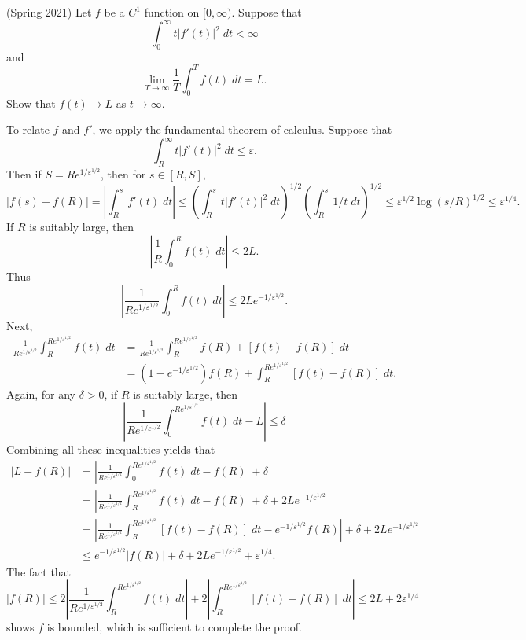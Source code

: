 \documentclass[answers]{exam}
\theoremstyle{problemstyle}
\newcommand{\1}[1]{\textbf{1}_{\left[#1\right]}} %
\begin{document}
\begin{questions}
\question (Spring 2021) Let $f$ be a $C^1$ function on $[0,\infty)$. Suppose that
%
\[ \int_0^\infty t |f'(t)|^2\; dt < \infty \]
%
and
%
\[ \lim_{T \to \infty} \frac{1}{T} \int_0^T f(t)\; dt = L. \]
%
Show that $f(t) \to L$ as $t \to \infty$.
\begin{solution}
    To relate $f$ and $f'$, we apply the fundamental theorem of calculus. Suppose that
    \[ \int_R^\infty t |f'(t)|^2\; dt \leq \varepsilon. \]
    Then if $S = R e^{1/\varepsilon^{1/2}}$, then for $s \in [R,S]$,
    \[ |f(s) - f(R)| = \left| \int_R^s f'(t)\; dt \right| \leq \left( \int_R^s t |f'(t)|^2\; dt \right)^{1/2} \left( \int_R^s 1/t\; dt \right)^{1/2} \leq \varepsilon^{1/2} \log(s/R)^{1/2} \leq \varepsilon^{1/4}. \]
    If $R$ is suitably large, then
    \[ \left| \frac{1}{R} \int_0^R f(t)\; dt \right| \leq 2L. \]
    Thus
    \[ \left| \frac{1}{R e^{1/\varepsilon^{1/2}}} \int_0^R f(t)\; dt \right| \leq 2L e^{-1/\varepsilon^{1/2}}. \]
    Next,
    \begin{align*}
        \frac{1}{R e^{1/\varepsilon^{1/2}}} \int_R^{Re^{1/\varepsilon^{1/2}}} f(t)\; dt &= \frac{1}{R e^{1/\varepsilon^{1/2}}} \int_R^{Re^{1/\varepsilon^{1/2}}} f(R) + [f(t) - f(R)]\; dt\\
        &= \left( 1 - e^{-1/\varepsilon^{1/2}} \right) f(R) + \int_R^{R e^{1/\varepsilon^{1/2}}} [f(t) - f(R)]\; dt.
    \end{align*}
    Again, for any $\delta > 0$, if $R$ is suitably large, then
    \[ \left| \frac{1}{R e^{1/\varepsilon^{1/2}}} \int_0^{R e^{1/\varepsilon^{1/2}}} f(t)\; dt - L \right| \leq \delta \]
    Combining all these inequalities yields that
    \begin{align*}
        |L - f(R)| &= \left| \frac{1}{R e^{1/\varepsilon^{1/2}}} \int_0^{R e^{1/\varepsilon^{1/2}}} f(t)\; dt - f(R) \right| + \delta\\
        &= \left| \frac{1}{R e^{1/\varepsilon^{1/2}}} \int_R^{R e^{1/\varepsilon^{1/2}}} f(t)\; dt - f(R) \right| + \delta + 2Le^{-1/\varepsilon^{1/2}}\\
        &= \left| \frac{1}{R e^{1/\varepsilon^{1/2}}} \int_R^{R e^{1/\varepsilon^{1/2}}} [f(t) - f(R)]\; dt - e^{-1/\varepsilon^{1/2}} f(R) \right| + \delta + 2Le^{-1/\varepsilon^{1/2}}\\
        &\leq e^{-1/\varepsilon^{1/2}} |f(R)| + \delta + 2L e^{-1/\varepsilon^{1/2}} + \varepsilon^{1/4}.
    \end{align*}
    The fact that
    \[ |f(R)| \leq 2 \left| \frac{1}{R e^{1/\varepsilon^{1/2}}} \int_R^{Re^{1/\varepsilon^{1/2}}} f(t)\; dt \right| + 2 \left| \int_R^{R e^{1/\varepsilon^{1/2}}} [f(t) - f(R)]\; dt \right| \leq 2L + 2 \varepsilon^{1/4} \]
    shows $f$ is bounded, which is sufficient to complete the proof.
\end{solution}



\end{questions}
\end{document}
